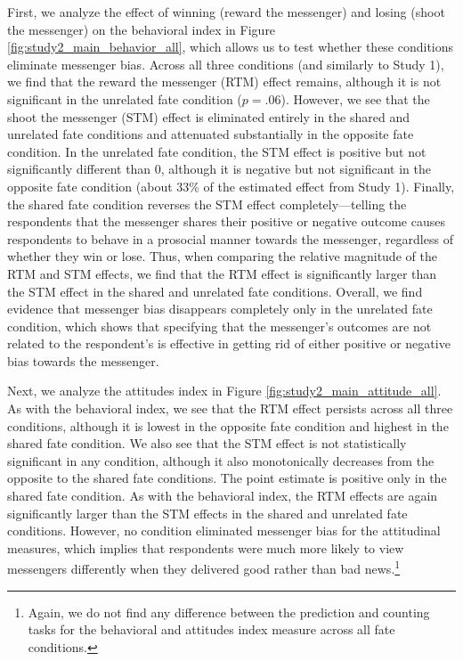 

First, we analyze the effect of winning (reward the messenger) and
losing (shoot the messenger) on the behavioral index in Figure \ref{fig:study2_main_behavior_all}, which allows us to
test whether these conditions eliminate messenger bias. Across all
three conditions (and similarly to Study 1), we find that the
reward the messenger (RTM) effect remains, although it is not
significant in the unrelated fate condition ($p = .06$). However, we
see that the shoot the messenger (STM) effect is eliminated entirely in
the shared and unrelated fate conditions and attenuated substantially in
the opposite fate condition. In the unrelated fate condition, the STM
effect is positive but not significantly different than 0, although it
is negative but not significant in the opposite fate condition (about
33\% of the estimated effect from Study 1). Finally, the shared
fate condition reverses the STM effect completely---telling the
respondents that the messenger shares their positive or negative outcome
causes respondents to behave in a prosocial manner towards the
messenger, regardless of whether they win or lose. Thus, when comparing
the relative magnitude of the RTM and STM effects, we find that the RTM
effect is significantly larger than the STM effect in the shared and unrelated fate conditions.
Overall, we find evidence that messenger bias disappears completely
only in the unrelated fate condition, which shows that specifying that
the messenger's outcomes are not related to the respondent's is
effective in getting rid of either positive or negative bias towards the
messenger.



Next, we analyze the attitudes index in Figure \ref{fig:study2_main_attitude_all}. As with the behavioral index, we
see that the RTM effect persists across all three conditions, although
it is lowest in the opposite fate condition and highest in the shared
fate condition. We also see that the STM effect is not statistically
significant in any condition, although it also monotonically decreases
from the opposite to the shared fate conditions. The point estimate is
positive only in the shared fate condition. As with the behavioral
index, the RTM effects are again significantly larger than the STM
effects in the shared and unrelated fate conditions. However, no condition eliminated
messenger bias for the attitudinal measures, which implies that
respondents were much more likely to view messengers differently when
they delivered good rather than bad news.\footnote{Again, we do not find any difference
between the prediction and counting tasks for the behavioral and attitudes index measure
across all fate conditions.}

